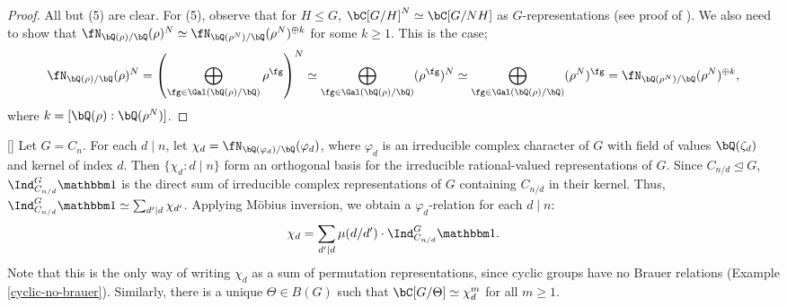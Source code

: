 \begin{proof}
    All but (5) are clear. For (5), observe that for $H \leq G$, $\bC[G / H]^N \simeq \bC[G / NH]$ as $G$-representations (see proof of \cite[Theorem 2.8]{reg-const}). We also need to show that $\repnorm{\rho}^N \simeq \repnorm{\rho^N}^{\oplus k}$ for some $k \geq 1$. This is the case; 
    $$\repnorm{\rho}^N = \left(\bigoplus_{\fg \in \Gal(\bQ(\rho) / \bQ)} \rho^{\fg} \right)^N \simeq 
    \bigoplus_{\fg \in \Gal(\bQ(\rho) / \bQ)} (\rho^{\fg})^N \simeq \bigoplus_{\fg \in \Gal(\bQ(\rho) / \bQ)} (\rho^N)^{\fg} = \repnorm{\rho^N}^{\oplus k},$$
    where $k = [ \bQ(\rho) : \bQ(\rho^N)]$. 
\end{proof}


\begin{example}\label{cyclic-relns}[\cite[Exercise 13.1]{Serre}]
    Let $G = C_n$. For each $d \mid n$, let $\chi_d = \repnorm{\varphi_d}$, where $\varphi_d$ is an irreducible complex character of $G$ with field of values $\bQ(\zeta_d)$ and kernel of index $d$.
    Then $\{ \chi_d \colon d\mid n \}$ form an orthogonal basis for the irreducible rational-valued representations of $G$. Since $C_{n / d} \trianglelefteq G$, $\Ind_{C_{n/ d}}^G \trivial$ is the direct sum of irreducible complex representations of $G$ containing $C_{n / d}$ in their kernel. Thus, $\Ind_{C_{n/ d}}^G \trivial \simeq \sum_{d' \mid d} \chi_{d'}$. Applying M\"{o}bius inversion, we obtain a $\varphi_d$-relation for each $d \mid n$:
    \[ \chi_d = \sum_{d' \mid d} \mu(d / d') \cdot \Ind_{C_{n/ d}}^G \trivial. \]
    Note that this is the only way of writing $\chi_d$ as a sum of permutation representations, since cyclic groups have no Brauer relations (Example \ref{cyclic-no-brauer}). Similarly, there is a unique $\Theta \in B(G)$ such that $\bC[G / \Theta] \simeq \chi_d^{m}$ for all $m \geq 1$.
    \end{example}
